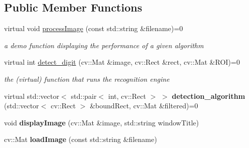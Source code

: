 \subsection*{Public Member Functions}
\begin{DoxyCompactItemize}
\item 
\mbox{\label{class_character___recognition___algorithm_ae830baa9ccf7c55ad73c78173188059e}} 
virtual void \mbox{\hyperlink{class_character___recognition___algorithm_ae830baa9ccf7c55ad73c78173188059e}{process\+Image}} (const std\+::string \&filename)=0
\begin{DoxyCompactList}\small\item\em a demo function displaying the performance of a given algorithm \end{DoxyCompactList}\item 
\mbox{\label{class_character___recognition___algorithm_ad360b10ac65fe20b42607ef9568052a3}} 
virtual int \mbox{\hyperlink{class_character___recognition___algorithm_ad360b10ac65fe20b42607ef9568052a3}{detect\+\_\+digit}} (cv\+::\+Mat \&image, cv\+::\+Rect \&rect, cv\+::\+Mat \&R\+OI)=0
\begin{DoxyCompactList}\small\item\em the (virtual) function that runs the recognition engine \end{DoxyCompactList}\item 
\mbox{\label{class_character___recognition___algorithm_af17cbb0e6b84fd9430ff1788f6c57740}} 
virtual std\+::vector$<$ std\+::pair$<$ int, cv\+::\+Rect $>$ $>$ {\bfseries detection\+\_\+algorithm} (std\+::vector$<$ cv\+::\+Rect $>$ \&bound\+Rect, cv\+::\+Mat \&filtered)=0
\item 
\mbox{\label{class_character___recognition___algorithm_ae6fbf353044a0d3d1c4703bff3a46080}} 
void {\bfseries display\+Image} (cv\+::\+Mat \&image, std\+::string window\+Title)
\item 
\mbox{\label{class_character___recognition___algorithm_ad7302516bfe29b94dd6787cfb4aa9183}} 
cv\+::\+Mat {\bfseries load\+Image} (const std\+::string \&filename)
\item 

\end{DoxyCompactItemize}
